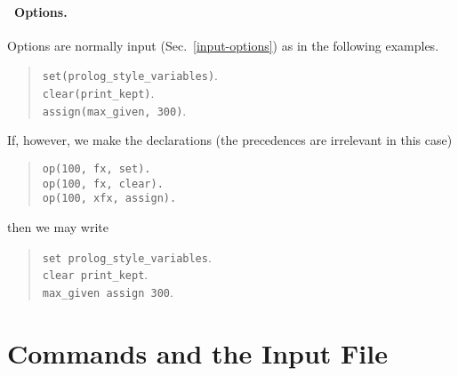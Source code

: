 \documentclass[11pt]{article}
\begin{document}
\paragraph{\otter\ Options.}  Options are normally input (Sec.~\ref{input-options})
as in the following examples.
\begin{verse} \small
\verb:set(prolog_style_variables):. \\
\verb:clear(print_kept):. \\
\verb:assign(max_given, 300):.
\end{verse}
If, however, we make the declarations
(the precedences are irrelevant in this case)
\begin{verse} \small
\verb:op(100, fx, set).: \\
\verb:op(100, fx, clear).: \\
\verb:op(100, xfx, assign).: \\
\end{verse}
then we may write
\begin{verse} \small
\verb:set prolog_style_variables:. \\
\verb:clear print_kept:. \\
\verb:max_given assign 300:.
\end{verse}

\section{Commands and the Input File} \label{commands}
\end{document}
